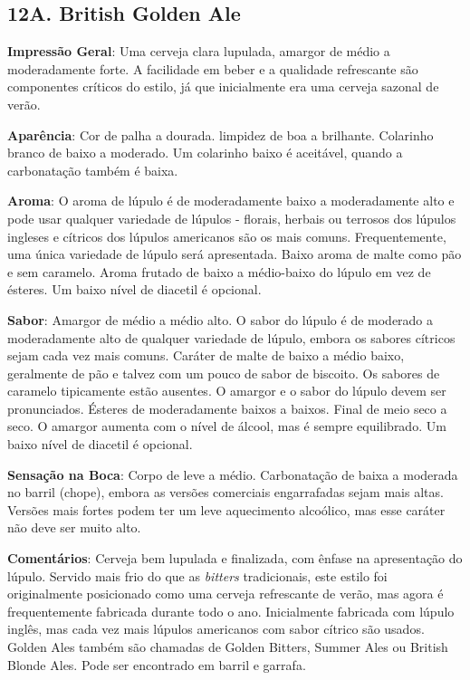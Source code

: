 \subsection*{12A. British Golden Ale}

\textbf{Impressão Geral}: Uma cerveja clara lupulada, amargor de médio a moderadamente forte. A facilidade em beber e a qualidade refrescante são componentes críticos do estilo, já que inicialmente era uma cerveja sazonal de verão.

\textbf{Aparência}: Cor de palha a dourada. limpidez de boa a brilhante. Colarinho branco de baixo a moderado. Um colarinho baixo é aceitável, quando a carbonatação também é baixa.

\textbf{Aroma}: O aroma de lúpulo é de moderadamente baixo a moderadamente alto e pode usar qualquer variedade de lúpulos - florais, herbais ou terrosos dos lúpulos ingleses e cítricos dos lúpulos americanos são os mais comuns. Frequentemente, uma única variedade de lúpulo será apresentada. Baixo aroma de malte como pão e sem caramelo. Aroma frutado de baixo a médio-baixo do lúpulo em vez de ésteres. Um baixo nível de diacetil é opcional.

\textbf{Sabor}: Amargor de médio a médio alto. O sabor do lúpulo é de moderado a moderadamente alto de qualquer variedade de lúpulo, embora os sabores cítricos sejam cada vez mais comuns. Caráter de malte de baixo a médio baixo, geralmente de pão e talvez com um pouco de sabor de biscoito. Os sabores de caramelo tipicamente estão ausentes. O amargor e o sabor do lúpulo devem ser pronunciados. Ésteres de moderadamente baixos a baixos. Final de meio seco a seco. O amargor aumenta com o nível de álcool, mas é sempre equilibrado. Um baixo nível de diacetil é opcional.

\textbf{Sensação na Boca}: Corpo de leve a médio. Carbonatação de baixa a moderada no barril (chope), embora as versões comerciais engarrafadas sejam mais altas. Versões mais fortes podem ter um leve aquecimento alcoólico, mas esse caráter não deve ser muito alto.

\textbf{Comentários}: Cerveja bem lupulada e finalizada, com ênfase na apresentação do lúpulo. Servido mais frio do que as \textit{bitters} tradicionais, este estilo foi originalmente posicionado como uma cerveja refrescante de verão, mas agora é frequentemente fabricada durante todo o ano. Inicialmente fabricada com lúpulo inglês, mas cada vez mais lúpulos americanos com sabor cítrico são usados. Golden Ales também são chamadas de Golden Bitters, Summer Ales ou British Blonde Ales. Pode ser encontrado em barril e garrafa.

